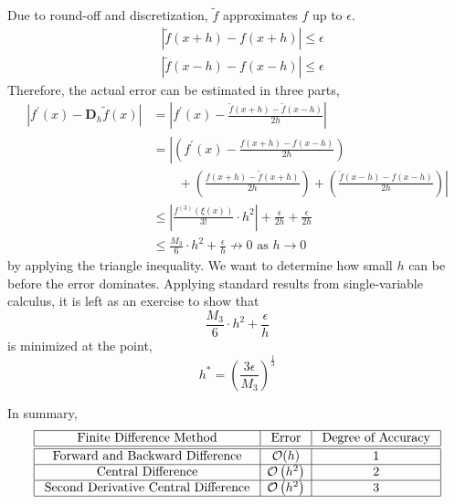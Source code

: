 \noindent Due to round-off and discretization, $\tilde{f}$ approximates $f$ up to $\epsilon$.
    \begin{align*}
    &|\tilde{f}(x+h)-f(x+h)| \leq \epsilon \\
    &|\tilde{f}(x-h)-f(x-h)| \leq \epsilon
\end{align*}
Therefore, the actual error can be estimated in three parts,
\begin{align*}
\left|f^{\prime}(x)-\mathbf{D}_h \tilde{f}(x)\right|&=\left|f^{\prime}(x)-\frac{\tilde{f}(x+h)-\tilde{f}(x-h)}{2 h}\right| \\
&=\left|\left(f^{\prime}(x)-\frac{f(x+h)-f(x-h)}{2 h}\right)\right. \\
&\quad \quad +\left.\left(\frac{f(x+h)-\tilde{f}(x+h)}{2 h}\right)+\left(\frac{\tilde{f}(x-h)-f(x-h)}{2 h}\right) \right| \\
&\leq\left|\frac{f^{(3)}(\xi(x))}{3 !} \cdot h^2\right|+\frac{\epsilon}{2 h}+\frac{\epsilon}{2 h} \\
&\leq \frac{M_3}{6} \cdot h^2+\frac{\epsilon}{h} \nrightarrow 0 \text { as } h \rightarrow 0
\end{align*}
by applying the triangle inequality. We want to determine how small $h$ can be before the error dominates. Applying standard results from single-variable calculus, it is left as an exercise to show that
\[\frac{M_3}{6} \cdot h^2+\frac{\epsilon}{h}\]
is minimized at the point,
\[h^*=\left(\frac{3 \epsilon}{M_3}\right)^{\frac{1}{3}}\]

\noindent In summary,
\[\begin{array}{|c|c|c|}
\hline \text { Finite Difference Method } & \text { Error } & \text { Degree of Accuracy } \\
\hline \hline \text { Forward and Backward Difference } & \mathcal{O}(h) & 1 \\
\hline \text { Central Difference } & \mathcal{O}\left(h^2\right) & 2 \\
\hline \text { Second Derivative Central Difference } & \mathcal{O}\left(h^2\right) & 3 \\
\hline
\end{array}\]